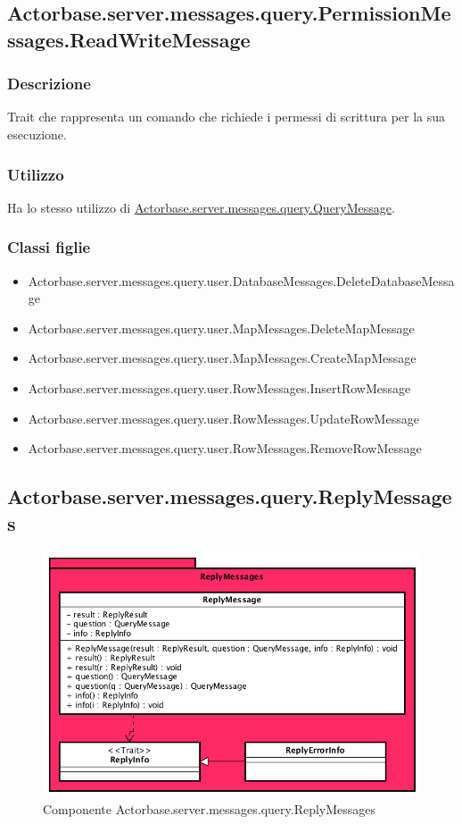\documentclass[a4paper]{article}
\begin{document}
		\subsection{Actorbase.server.messages.query.PermissionMessages.ReadWriteMessage}
			\subsubsection{Descrizione}
				Trait che rappresenta un comando che richiede i permessi di scrittura per la sua esecuzione.
				
			\subsubsection{Utilizzo}
				Ha lo stesso utilizzo di \hyperref[QueryMessage]{Actorbase.server.messages.query.QueryMessage}.
				
			\subsubsection{Classi figlie}
				\begin{itemize}
					\item Actorbase.server.messages.query.user.DatabaseMessages.DeleteDatabaseMessage
					\item Actorbase.server.messages.query.user.MapMessages.DeleteMapMessage
					\item Actorbase.server.messages.query.user.MapMessages.CreateMapMessage
					\item Actorbase.server.messages.query.user.RowMessages.InsertRowMessage
					\item Actorbase.server.messages.query.user.RowMessages.UpdateRowMessage
					\item Actorbase.server.messages.query.user.RowMessages.RemoveRowMessage
				\end{itemize}
				
				\subsection{Actorbase.server.messages.query.ReplyMessages}	
					\begin{figure}[H]
				\centering
				\includegraphics[width=\textwidth]{ST/Server/ReplyMessageLevel.png}
				\caption{Componente Actorbase.server.messages.query.ReplyMessages}
			\end{figure}
\end{document}
